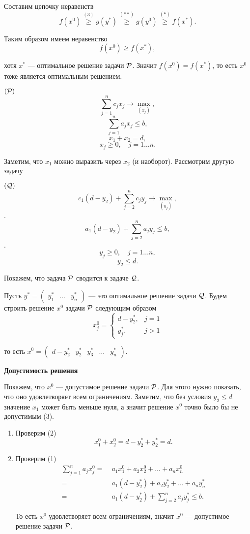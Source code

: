 Составим цепочку неравенств
\[
f(x^0) \stackrel{(3)}{\ge} g(y^*) \stackrel{(**)}{\ge} g(y^0) \stackrel{(*)}{\ge} f(x^*).
\]

Таким образом имеем неравенство
\[
f(x^0) \ge f(x^*),
\]

хотя $x^*$ --- оптимальное решение задачи $\P$. Значит $f(x^0) = f(x^*)$, то есть $x^0$ тоже является оптимальным решением.

\example\label{ex:reduction_to_other_problem}

$(\P)$
\[\sum_{j=1}^{n} c_j x_j \to \max_{(x_j)},\]
\[\sum_{j=1}^{n} a_j x_j \le b \tag{1},\]
\[x_1 + x_2 = d \tag{2},\]
\[x_j \ge 0, \quad j = 1\dots n. \tag{3}\]

Заметим, что $x_1$ можно выразить через $x_2$ (и наоборот). Рассмотрим другую задачу

$(\Q)$
\[c_1(d - y_2) + \sum_{j=2}^{n} c_j y_j \to \max_{(y_j)},\].
\[a_1 (d-y_2) + \sum_{j=2}^{n}a_j y_j \le b,\].
\[y_j \ge 0, \quad j = 1\dots n,\]
\[y_2 \le d.\]

Покажем, что задача $\P$ сводится к задаче $\Q$.

\prooof

Пусть $y^* = \begin{pmatrix} y^*_1 & \dots & y^*_n \end{pmatrix}$ --- это оптимальное решение задачи $\Q$. Будем строить решение $x^0$ задачи $\P$ следующим образом
\[
x^0_j = \begin{cases}
	d - y_2^*,& j = 1 \\
	y_j^*,& j > 1
\end{cases}
\]

то есть $x^0 = \begin{pmatrix} d - y_2^* & y_2^* & y_3^* & \dots & y_n^* \end{pmatrix}$.

\bigskip

\textbf{Допустимость решения}

Покажем, что $x^0$ --- допустимое решение задачи $\P$. Для этого нужно показать, что оно удовлетворяет всем ограничениям. Заметим, что без условия $y_2 \le d$ значение $x_1$ может быть меньше нуля, а значит решение $x^0$ точно было бы не допустимым (3).

\begin{enumerate}[nosep]
	\item Проверим (2)
	\[
	x^0_1 + x^0_2 = d - y^*_2 + y^*_2 = d.
	\]
	
	\item Проверим (1)
	\begin{align*}
		\sum_{j=1}^{n} a_j x^0_j =& \; a_1 x^0_1 + a_2 x^0_2 + \dots + a_n x^0_n \\
		=& \; a_1 (d - y^*_2) + a_2 y^*_2 + \dots + a_n y^*_n \\
		=& \; a_1 (d-y^*_2) + \sum_{j=2}^{n}a_j y^*_j \le b.
	\end{align*}
	
	То есть $x^0$ удовлетворяет всем ограничениям, значит $x^0$ --- допустимое решение задачи $\P$.
\end{enumerate}

